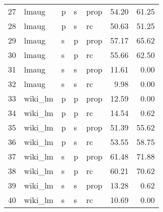 \begin{tabular}{rllllrr}
  27 & lmaug & p & s & prop & 54.20 & 61.25 \\ 
  28 & lmaug & p & s & rc & 50.63 & 51.25 \\ 
  29 & lmaug & s & p & prop & 57.17 & 65.62 \\ 
  30 & lmaug & s & p & rc & 55.66 & 62.50 \\ 
  31 & lmaug & s & s & prop & 11.61 & 0.00 \\ 
  32 & lmaug & s & s & rc & 9.98 & 0.00 \\ 
  33 & wiki\_lm & p & p & prop & 12.59 & 0.00 \\ 
  34 & wiki\_lm & p & p & rc & 14.54 & 0.62 \\ 
  35 & wiki\_lm & p & s & prop & 51.39 & 55.62 \\ 
  36 & wiki\_lm & p & s & rc & 53.55 & 58.75 \\ 
  37 & wiki\_lm & s & p & prop & 61.48 & 71.88 \\ 
  38 & wiki\_lm & s & p & rc & 60.21 & 70.62 \\ 
  39 & wiki\_lm & s & s & prop & 13.28 & 0.62 \\ 
  40 & wiki\_lm & s & s & rc & 10.69 & 0.00 \\ 
   \hline
\end{tabular}
